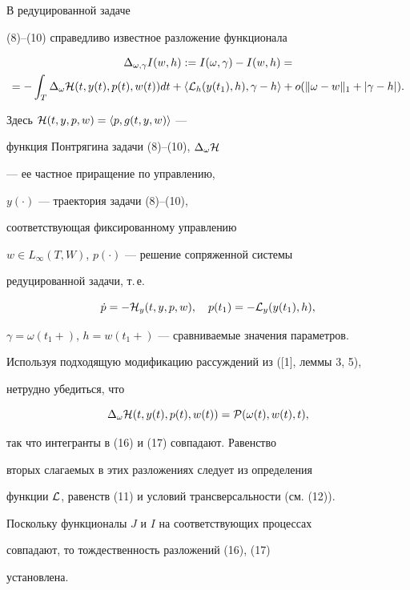 \begin{pf}


В редуцированной задаче


(8)--(10) справедливо известное разложение функционала


\begin{multline}


\Delta_{\omega, \gamma} I(w,h):=I(\omega,\gamma)-I(w,h) = \\


=-\int_T \Delta_\omega{\cal H}(t,y(t),p(t),w(t))dt+


\langle {\cal L}_h(y(t_1),h),\gamma-h\rangle + 


o(\|\omega-w\|_1 + |\gamma - h|).


\end{multline}


Здесь ${\cal H}(t,y,p,w)=\langle p,g(t,y,w)\rangle $ ---


функция Понтрягина задачи (8)--(10), $\Delta_\omega {\cal H}$


--- ее частное приращение по управлению,


$y(\cdot)$ --- траектория задачи (8)--(10), 


соответствующая фиксированному управлению


$w\in L_\infty(T,W)$, $p(\cdot)$ --- решение сопряженной системы 


редуцированной задачи, т.\,е.


$$


\Dot{p} =-{\cal H}_y(t,y,p,w), \quad p(t_1)=-{\cal L}_y(y(t_1),h),


$$


$\gamma=\omega(t_1+)$, $h=w(t_1+)$ --- сравниваемые значения параметров.





Используя подходящую модификацию рассуждений из ([1], леммы 3, 5), 


нетрудно убедиться, что


$$


\Delta_\omega {\cal H}(t,y(t),p(t),w(t))={\cal P}(\omega(t),w(t),t),


$$


так что интегранты в (16) и (17) совпадают. Равенство 


вторых слагаемых в этих разложениях следует из определения


функции $\cal L$, равенств (11) и условий трансверсальности (см. (12)). 


Поскольку функционалы $J$ и $I$ на соответствующих процессах 


совпадают, то тождественность разложений (16), (17)


установлена.


\end{pf}





